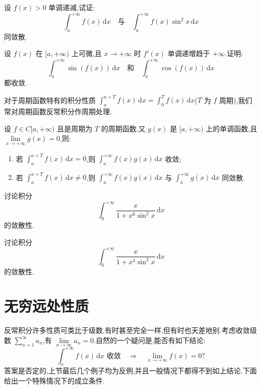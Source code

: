 \documentclass[../../数学分析培优讲义.tex]{subfiles}
\begin{document}
\begin{example}
设 $f(x)>0$ 单调递减,试证:
\[
    \int_a^{+\infty}f(x)\,\mathrm{d}x
    \quad\text{与}\quad
    \int_a^{+\infty}f(x)\sin^2x\,\mathrm{d}x
\]
同敛散.
\end{example}
\exampleblank

\begin{example}
设 $f(x)$ 在 $\lbrack a,+\infty)$ 上可微,且 $x\to+\infty$ 时 $f'(x)$ 单调递增趋于 $+\infty$.证明:
\[
    \int_a^{+\infty}\sin(f(x))\,\mathrm{d}x
    \quad\text{和}\quad
    \int_a^{+\infty}\cos(f(x))\,\mathrm{d}x
\]
都收敛.
\end{example}
\exampleblank

对于周期函数特有的积分性质 $\displaystyle\int_a^{a+T}f(x)\,\mathrm{d}x=\int_0^Tf(x)\,\mathrm{d}x$($T$ 为 $f$ 周期),我们常对周期函数反常积分作周期处理.

\begin{example}
设 $f\in C\lbrack a,+\infty)$ 且是周期为 $T$ 的周期函数,又 $g(x)$ 是 $\lbrack a,+\infty)$ 上的单调函数,且 $\displaystyle\lim\limits_{x\to+\infty}g(x)=0$,则:
\begin{enumerate}[label=(\arabic*)]
    \item 若 $\displaystyle\int_a^{a+T}f(x)\,\mathrm{d}x=0$,则 $\displaystyle\int_a^{+\infty}f(x)g(x)\,\mathrm{d}x$ 收敛;
    \item 若 $\displaystyle\int_a^{a+T}f(x)\,\mathrm{d}x\neq0$,则 $\displaystyle\int_a^{+\infty}f(x)g(x)\,\mathrm{d}x$ 与 $\displaystyle\int_a^{+\infty}g(x)\,\mathrm{d}x$ 同敛散.
\end{enumerate}
\end{example}
\exampleblank

\begin{example}[\markstar]
讨论积分
\[
    \int_0^{+\infty}\dfrac{x}{1+x^6\sin^2x}\,\mathrm{d}x
\]
的敛散性.
\end{example}
\exampleblank

\begin{example}[\markstar]
讨论积分
\[
    \int_0^{+\infty}\dfrac{x}{1+x^4\sin^2x}\,\mathrm{d}x
\]
的敛散性.
\end{example}
\exampleblank


\newpage

\section{无穷远处性质}

反常积分许多性质可类比于级数,有时甚至完全一样,但有时也天差地别.考虑收敛级数 $\displaystyle\sum\limits_{n=1}^{\infty}a_n$,有 $\displaystyle\lim\limits_{n\to\infty}a_n=0$.自然的一个疑问是,能否有如下结论:
\[
    \int_a^{+\infty}f(x)\,\mathrm{d}x\text{ 收敛}
    \quad\Longrightarrow\quad
    \lim\limits_{x\to+\infty}f(x)=0?
\]
答案是否定的,上节最后几个例子均为反例,并且一般情况下都得不到如上结论.下面给出一个特殊情况下的成立条件.
\end{document}
